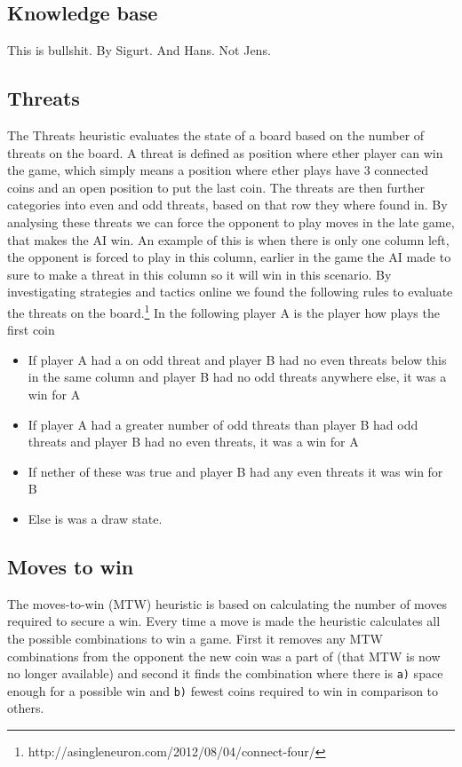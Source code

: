 \documentclass[a4paper, titlepage]{article}
\begin{document}
\subsection*{Knowledge base}	
This is bullshit. By Sigurt. And Hans. Not Jens.

\subsection*{Threats}
The Threats heuristic evaluates the state of a board based on the number of threats on the board. 
A threat is defined as position where ether player can win the game, which simply means a position
where ether plays have 3 connected coins and an open position to put the last coin. 
The threats are then further categories into even and odd threats, based on that row they where found in.
By analysing these threats we can force the opponent to play moves in the late game, that makes the AI win.
An example of this is when there is only one column left, the opponent is forced to play in this column, 
earlier in the game the AI made to sure to make a threat in this column so it will win in this scenario. 
By investigating strategies and tactics online we found the following rules to evaluate the threats on the board.\footnote{http://asingleneuron.com/2012/08/04/connect-four/}
In the following player A is the player how plays the first coin
\begin{itemize} 
	\item If player A had a on odd threat and player B had no even threats below this in the same column and player B had no odd threats anywhere else, it was a win for A
	\item If player A had a greater number of odd threats than player B had odd threats and player B had no even threats, it was a win for A	
	\item If nether of these was true and player B had any even threats it was win for B
	\item Else is was a draw state.
\end{itemize} 

\subsection*{Moves to win}
The moves-to-win (MTW) heuristic is based on calculating the number of moves required to 
secure a win. Every time a move is made the heuristic calculates all the possible 
combinations to win a game. First it removes any MTW combinations from the opponent
the new coin was a part of (that MTW is now no longer available) and second it finds 
the combination where there is \texttt{a)} space enough for a possible win and 
\texttt{b)} fewest coins required to win in comparison to others.
\end{document}
